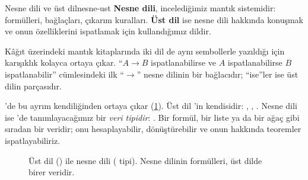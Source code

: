 \begin{tanim}{Nesne dili ve üst dil}{nesne-ust}
\textbf{Nesne dili}, incelediğimiz mantık sistemidir: formülleri,
bağlaçları, çıkarım kuralları. \textbf{Üst dil} ise nesne dili hakkında
konuşmak ve onun özelliklerini ispatlamak için kullandığımız dildir.
\end{tanim}

\noindent Kâğıt üzerindeki mantık kitaplarında iki dil de aynı sembollerle
yazıldığı için karışıklık kolayca ortaya çıkar. ``$A \to B$ ispatlanabilirse
ve $A$ ispatlanabilirse $B$ ispatlanabilir'' cümlesindeki ilk ``$\to$''
nesne dilinin bir bağlacıdır; ``ise''ler ise üst dilin parçasıdır.

\Lean{}'de bu ayrım kendiliğinden ortaya çıkar (\cref{fig:nesne-ust}).
Üst dil \Lean{}'in kendisidir: , , . Nesne dili ise
\Lean{}'de tanımlayacağımız bir \emph{veri tipidir}: . Bir
formül, bir liste ya da bir ağaç gibi sıradan bir veridir; onu
hesaplayabilir, dönüştürebilir ve onun hakkında teoremler
ispatlayabiliriz.

\begin{figure}[htbp]
\centering
{}
\caption{Üst dil (\Lean{}) ile nesne dili ( tipi). Nesne
dilinin formülleri, üst dilde birer veridir.}
\label{fig:nesne-ust}
\end{figure}

